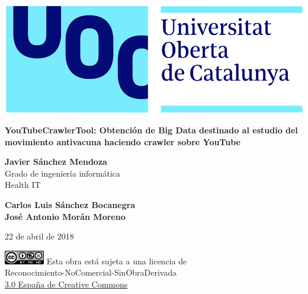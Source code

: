 \documentclass[11pt,a4paper]{article}
\begin{document}
\begin{titlepage}
\includegraphics[scale=0.2,right,valign=t]{uoc-logo.png}
\vspace*{\fill}
\begin{flushleft}
{\LARGE \textbf{YouTubeCrawlerTool: Obtención de Big Data destinado al estudio del movimiento antivacuna haciendo crawler sobre YouTube}}
\end{flushleft}
\begin{flushleft}
\textbf{Javier Sánchez Mendoza}\\
Grado de ingeniería informática\\
Health IT
\end{flushleft}
\begin{flushleft}
\textbf{Carlos Luis Sánchez Bocanegra}\\
\textbf{José Antonio Morán Moreno}
\end{flushleft}
\begin{flushleft}
22 de abril de 2018  
\end{flushleft}
\end{titlepage}


\begin{titlepage}
\vspace*{\fill}
\begin{flushleft}
\includegraphics[scale=1,left]{licencia-cc.png}
Esta obra está sujeta a una licencia de\\
Reconocimiento-NoComercial-SinObraDerivada\\
\href{http://creativecommons.org/licenses/by-nc-nd/3.0/es/}{3.0 España de Creative Commons}
\end{flushleft}
\end{titlepage}
\end{document}
